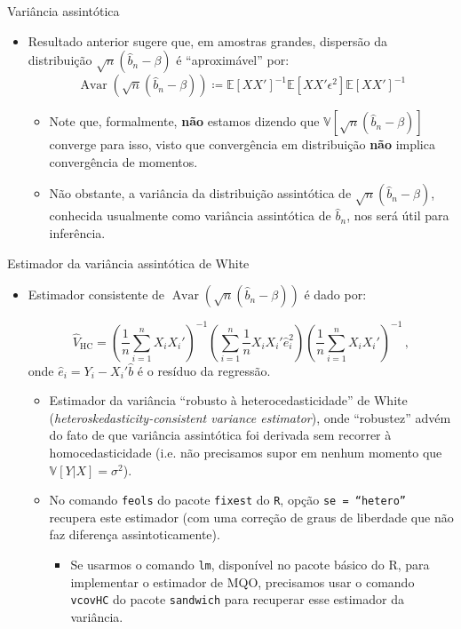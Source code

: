 \documentclass[11pt]{beamer}
\begin{document}
	\begin{frame}{Variância assintótica}
		\begin{itemize}
			\item Resultado anterior sugere que, em amostras grandes, dispersão da distribuição $\sqrt{n}(\hat{b}_n - \beta) $ é ``aproximável'' por: 
			$$\operatorname{Avar}(\sqrt{n}(\hat{b}_n - \beta))\coloneqq\mathbb{E}[XX']^{-1}\mathbb{E}[XX'\epsilon^2]\mathbb{E}[XX']^{-1}$$
			\vspace{-0.5em}
			\begin{itemize}
				\item Note que, formalmente, \textbf{não} estamos dizendo que $\mathbb{V}\left[\sqrt{n}(\hat{b}_n - \beta) \right]$ converge para isso, visto que convergência em distribuição \textbf{não} implica convergência de momentos.
				\item Não obstante, a variância da distribuição assintótica de $\sqrt{n}(\hat{b}_n - \beta)$, conhecida usualmente como {\color{blue}variância assintótica de $\hat{b}_n$}, nos será útil para inferência.
			\end{itemize}
		\end{itemize}
	\end{frame}
	\begin{frame}{Estimador da variância assintótica de White}
\begin{itemize}
	 			\item Estimador consistente de $\operatorname{Avar}(\sqrt{n}(\hat{b}_n - \beta))$ é dado por:
	
	$$\hat{V}_{\text{HC}} = \left(\frac{1}{n}\sum_{i=1}^n X_i X_i'\right)^{-1}\left(\sum_{i=1}^n\frac{1}{n} X_i X_i' \hat{e}_i^2\right) \left(\frac{1}{n}\sum_{i=1}^n X_i X_i'\right)^{-1}\, ,$$
	onde $\hat{e}_i = Y_i - X_i'\hat{b}$ é o resíduo da regressão.
	\begin{itemize}
		\item Estimador da variância ``{\color{blue}robusto à heterocedasticidade}'' de White (\textit{heteroskedasticity-consistent variance estimator}),  onde ``robustez'' advém do fato de que variância assintótica foi derivada sem recorrer à homocedasticidade (i.e. não precisamos supor em nenhum momento que $\mathbb{V}[Y|X] =\sigma^2$).
		\item No comando \texttt{feols} do pacote \texttt{fixest} do \texttt{R}, opção \texttt{se = ``hetero''} recupera este estimador (com uma correção de graus de liberdade que não faz diferença assintoticamente).
		\begin{itemize}
			\item Se usarmos o comando \texttt{lm}, disponível no pacote básico do R, para implementar o estimador de MQO, precisamos usar o comando \texttt{vcovHC} do pacote \texttt{sandwich} para recuperar esse estimador da variância.
		\end{itemize}
	\end{itemize}
\end{itemize}
	\end{frame}
	
\end{document}
